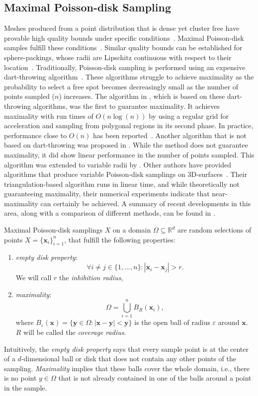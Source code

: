 \documentclass[preprint, 10pt]{elsarticle}
\newcommand{\vx}{{\mathbf x}}
\newcommand{\vy}{{\mathbf y}}
\theoremstyle{definition}
\theoremstyle{remark}
\begin{document}
\subsection{Maximal Poisson-disk Sampling}\label{sec:mpds}

Meshes produced from a point distribution that is dense yet cluster free have provable high quality bounds under specific conditions~\cite{MDS_good_trig2,MDS_good_trig3,MDS_good_trig1}.
Maximal Poisson-disk samples fulfill these conditions~\cite{monte-carlo}. 
Similar quality bounds can be established for sphere-packings, whose radii are Lipschitz continuous with respect to their location~\cite{Lipschitz1,Lipschitz2,Lipschitz3}. 
Traditionally, Poisson-disk sampling is performed using an expensive dart-throwing algorithm~\cite{aliasing_3}.
These algorithms struggle to achieve maximality as the probability to select a free spot becomes decreasingly small as the number of points sampled ($n$) increases. 
The algorithm in \cite{varrad}, which is based on these dart-throwing algorithms, was the first to guarantee maximality. 
It achieves maximality with run times of $O(n\log(n))$ by using a regular grid for acceleration and sampling from polygonal regions in its second phase.
In practice, performance close to $O(n)$ has been reported~\cite{eff_mds,mds_simple,varrad}. 
Another algorithm that is not based on dart-throwing was proposed in \cite{Bridson2007FastPD}.
While the method does not guarantee maximality, it did show linear performance in the number of points sampled. 
This algorithm was extended to variable radii by \citep{fastvar}. 
Other authors have provided algorithms that produce variable Poisson-disk samplings on 3D-surfaces~\cite{GUO1,Guo2}. 
Their triangulation-based algorithm runs in linear time, and while theoretically not guaranteeing maximality, their numerical experiments indicate that near-maximality can certainly be achieved.  
A summary of recent developments in this area, along with a comparison of different methods, can be found in \cite{DongMing}.




Maximal Poisson-disk samplings $X$ on a domain $\Omega\subseteq \mathbb{R}^d$ are random selections of points $X=\{\vx_i\}_{i=1}^n$, that fulfill the following properties:
\begin{enumerate}
	\item \textit{empty disk property}: $$\forall i\neq j \in \{1,...,n\}: |\vx_i-\vx_j|>r.$$
	We will call $r$ the \textit{inhibition radius},
	\item \textit{maximality}:	
	$$\Omega= \bigcup_{i=1}^n B_R(\vx_i),$$
	where $B_\varepsilon(\vx)=\{\vy\in \Omega: |\vx-\vy|<\vy\}$ is the open ball of radius $\varepsilon$ around $\vx$. $R$ will be called the \textit{coverage radius}. \cite{varrad}
	
\end{enumerate}
Intuitively, the \textit{empty disk property} says that every sample point is at the center of a $d$-dimensional ball or disk that does not contain any other points of the sampling. 
\textit{Maximality} implies that these balls cover the whole domain, i.e., there is no point $y\in \Omega$ that is not already contained in one of the balls around a point in the sample.
\end{document}

